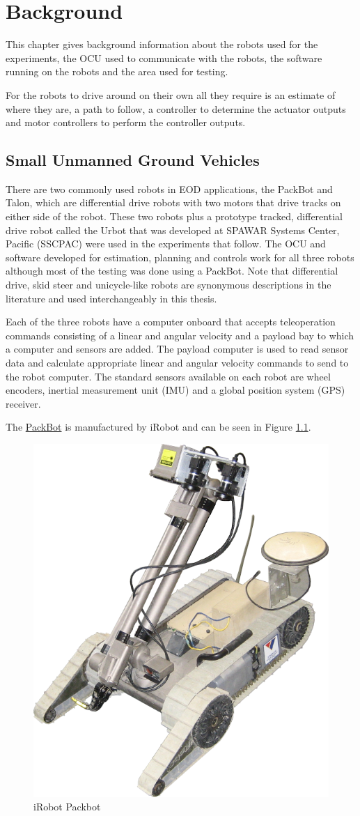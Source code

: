 \chapter{Background}
\label{ch:background}
This chapter gives background information about the robots used for the experiments, the OCU used to communicate with the robots, the software running on the robots and the area used for testing.

For the robots to drive around on their own all they require is an estimate of where they are, a path to follow, a controller to determine the actuator outputs and motor controllers to perform the controller outputs.

\section{Small Unmanned Ground Vehicles}
\label{sec:smallugvs}
There are two commonly used robots in EOD applications, the PackBot and Talon, which are differential drive robots with two motors that drive tracks on either side of the robot. These two robots plus a prototype tracked, differential drive robot called the Urbot that was developed at SPAWAR Systems Center, Pacific (SSCPAC) were used in the experiments that follow. The OCU and software developed for estimation, planning and controls work for all three robots although most of the testing was done using a PackBot. Note that differential drive, skid steer and unicycle-like robots are synonymous descriptions in the literature and used interchangeably in this thesis.

Each of the three robots have a computer onboard that accepts teleoperation commands consisting of a linear and angular velocity and a payload bay to which a computer and sensors are added. The payload computer is used to read sensor data and calculate appropriate linear and angular velocity commands to send to the robot computer. The standard sensors available on each robot are wheel encoders, inertial measurement unit (IMU) and a global position system (GPS) receiver.

The \href{http://www.irobot.com/sp.cfm?pageid=171}{PackBot} is manufactured by iRobot and can be seen in Figure \ref{fig:packbot}.

\begin{figure}[ht!]
	\centering
	\includegraphics[width=.3\textwidth]{images/packbot}
	\caption{iRobot Packbot}
	\label{fig:packbot}
\end{figure}

